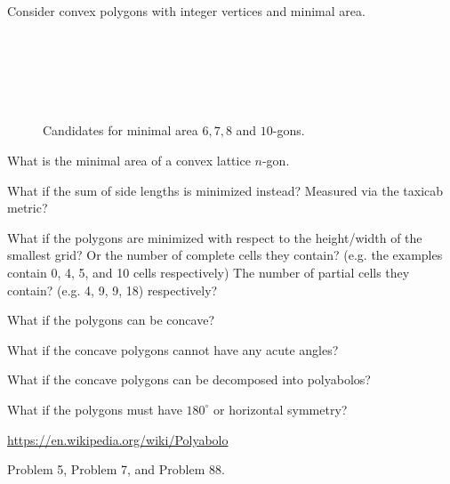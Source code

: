 \documentclass{article}
\begin{document}
  Consider convex polygons with integer vertices and minimal area.

\begin{figure}[ht!]
  \centering
  ~~~
  ~~~
  ~~~
  \caption{
    Candidates for minimal area $6, 7, 8$ and $10$-gons.
  }
\end{figure}

\begin{question}
  What is the minimal area of a convex lattice $n$-gon.
\end{question}

\begin{related}
  \item What if the sum of side lengths is minimized instead? Measured via the
  taxicab metric?
  \item What if the polygons are minimized with respect to the height/width of
  the smallest grid? Or the number of complete cells they contain? (e.g. the
  examples contain 0, 4, 5, and 10 cells respectively) The number of partial
  cells they contain? (e.g. 4, 9, 9, 18) respectively?
  \item What if the polygons can be concave?
  \item What if the concave polygons cannot have any acute angles?
  \item What if the concave polygons can be decomposed into polyabolos?
  \item What if the polygons must have $180^\circ$ or horizontal symmetry?
\end{related}

\begin{references}
  \item \url{https://en.wikipedia.org/wiki/Polyabolo}
  \item Problem 5, Problem 7, and Problem 88.
\end{references}
\end{document}
